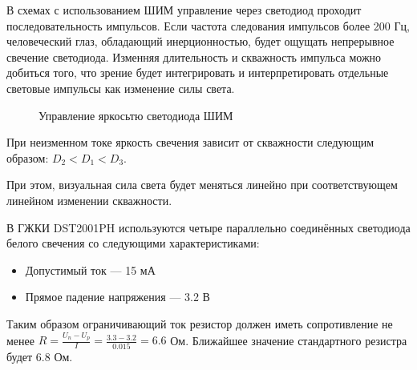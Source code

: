 В схемах с использованием ШИМ управление через светодиод проходит последовательность импульсов.
Если частота следования импульсов более 200 Гц, человеческий глаз, обладающий инерционностью,
будет ощущать непрерывное свечение светодиода. Изменняя длительность и скважность импульса
можно добиться того, что зрение будет интегрировать и интерпретировать отдельные световые
импульсы как изменение силы света.


\begin{figure}[ht]
	\caption{Управление яркосьтю светодиода ШИМ}
	\label{img:led_pwm}
\end{figure}


При неизменном токе яркость свечения зависит от скважности
следующим образом: $D_2 < D_1 < D_3$.

При этом, визуальная сила света будет меняться линейно при соответствующем
линейном изменении скважности.

В ГЖКИ DST2001PH используются четыре параллельно соединённых светодиода белого
свечения со следующими характеристиками:
\begin{itemize}
    \item{}Допустимый ток --- 15 мА
    \item{}Прямое падение напряжения --- 3.2 В
\end{itemize}

Таким образом ограничивающий ток резистор должен иметь сопротивление не менее
$R = \frac{U_n - U_p}{I} = \frac{3.3 - 3.2} {0.015} = 6.6$ Ом.
Ближайшее значение стандартного резистра будет 6.8 Ом.
